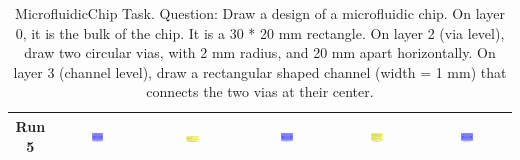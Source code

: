 \begin{table}[H]
\begin{tabular}{|c|c|c|c|c|c|}
    \hline
    Run 5 & \includegraphics[width=0.15\textwidth]{./run_5/png/gpt-4o_results/MicrofluidicChip.png} & \includegraphics[width=0.15\textwidth]{./run_5/png/claude-3-5-sonnet-20240620_results/MicrofluidicChip.png} & \includegraphics[width=0.15\textwidth]{./run_5/png/watsonx_meta-llama_llama-3-1-70b-instruct_results/MicrofluidicChip.png} & \includegraphics[width=0.15\textwidth]{./run_5/png/watsonx_meta-llama_llama-3-405b-instruct_results/MicrofluidicChip.png} & \includegraphics[width=0.15\textwidth]{./run_5/png/o1-preview_results/MicrofluidicChip.png} \\
    \hline
    \end{tabular}
    \caption{MicrofluidicChip Task. Question: Draw a design of a microfluidic chip. On layer 0, it is the bulk of the chip. It is a 30 * 20 mm rectangle. On layer 2 (via level), draw two circular vias, with 2 mm radius, and 20 mm apart horizontally. On layer 3 (channel level), draw a rectangular shaped channel (width = 1 mm) that connects the two vias at their center.}
\end{table}

